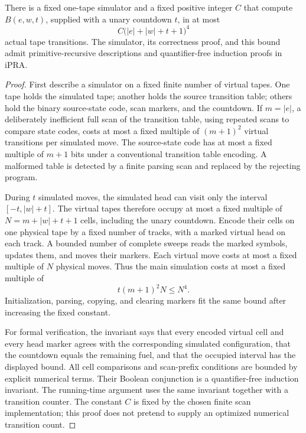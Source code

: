 \begin{lemma}
\label{lem:coarse-universal}
There is a fixed one-tape simulator and a fixed positive integer \(C\) that
compute \(B(e,w,t)\), supplied with a unary countdown \(t\), in at most
\[
  C\bigl(|e|+|w|+t+1\bigr)^4
\]
actual tape transitions.  The simulator, its correctness proof, and this
bound admit primitive-recursive descriptions and quantifier-free induction
proofs in iPRA.
\end{lemma}

\begin{proof}
First describe a simulator on a fixed finite number of virtual tapes.  One
tape holds the simulated tape; another holds the source transition table;
others hold the binary source-state code, scan markers, and the countdown.
If \(m=|e|\), a deliberately inefficient full scan of the transition table,
using repeated scans to compare state codes, costs at most a fixed multiple
of \((m+1)^2\) virtual transitions per simulated move.  The source-state code
has at most a fixed multiple of \(m+1\) bits under a conventional transition
table encoding.  A malformed table is detected by a finite parsing scan and
replaced by the rejecting program.

During \(t\) simulated moves, the simulated head can visit only the interval
\([-t,|w|+t]\).  The virtual tapes therefore occupy at most a fixed multiple
of
\(N=m+|w|+t+1\) cells, including the unary countdown.  Encode their cells on
one physical tape by a fixed number of tracks, with a marked virtual head on
each track.  A bounded number of complete sweeps reads the marked symbols,
updates them, and moves their markers.  Each virtual move costs at most a
fixed multiple of \(N\) physical moves.  Thus the main simulation costs at
most a fixed multiple of
\[
  t(m+1)^2N\leq N^4.
\]
Initialization, parsing, copying, and clearing markers fit the same bound
after increasing the fixed constant.

For formal verification, the invariant says that every encoded virtual cell
and every head marker agrees with the corresponding simulated configuration,
that the countdown equals the remaining fuel, and that the occupied interval
has the displayed bound.  All cell comparisons and scan-prefix conditions
are bounded by explicit numerical terms.  Their Boolean conjunction is a
quantifier-free induction invariant.  The running-time argument uses the
same invariant together with a transition counter.  The constant \(C\) is
fixed by the chosen finite scan implementation; this proof does not pretend
to supply an optimized numerical transition count.
\end{proof}

